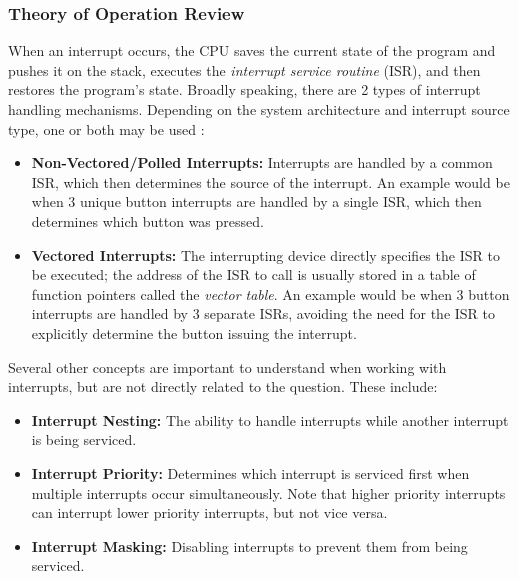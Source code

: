 \documentclass[main.tex]{subfiles}
\begin{document}
\subsubsection{Theory of Operation Review}
When an interrupt occurs, the CPU saves the current state of the program and pushes it on the stack, executes the \textit{interrupt service routine} (ISR), and then restores the program's state. \cite{white2024}
\newline
\newnoindentpara Broadly speaking, there are 2 types of interrupt handling mechanisms. Depending on the system architecture and interrupt source type, one or both may be used \cite{myersInterrupts}:
\begin{itemize}
    \item \textbf{Non-Vectored/Polled Interrupts:} Interrupts are handled by a common ISR, which then determines the source of the interrupt. An example would be when 3 unique button interrupts are handled by a single ISR, which then determines which button was pressed.
    \item \textbf{Vectored Interrupts:} The interrupting device directly specifies the ISR to be executed; the address of the ISR to call is usually stored in a table of function pointers called the \textit{vector table}. An example would be when 3 button interrupts are handled by 3 separate ISRs, avoiding the need for the ISR to explicitly determine the button issuing the interrupt.
\end{itemize}

\newnoindentpara Several other concepts are important to understand when working with interrupts, but are not directly related to the question. These include:
\begin{itemize}
    \item \textbf{Interrupt Nesting:} The ability to handle interrupts while another interrupt is being serviced.
    \item \textbf{Interrupt Priority:} Determines which interrupt is serviced first when multiple interrupts occur simultaneously. Note that higher priority interrupts can interrupt lower priority interrupts, but not vice versa.
    \item \textbf{Interrupt Masking:} Disabling interrupts to prevent them from being serviced.
\end{itemize}
\end{document}
